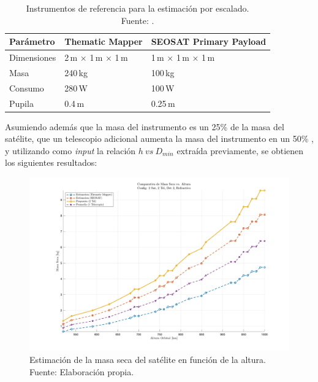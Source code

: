 \begin{table}[H]
    \centering
    \caption{Instrumentos de referencia para la estimación por escalado. \\ Fuente: \cite{zorita_dimensiones_2023}.}
    \begin{tabular}{@{}lll@{}}
        \toprule
        Parámetro     & Thematic Mapper       & SEOSAT Primary Payload \\
        \midrule
        Dimensiones   & 2\,m × 1\,m × 1\,m     & 1\,m × 1\,m × 1\,m      \\
        Masa          & 240\,kg                & 100\,kg                \\
        Consumo       & 280\,W                 & 100\,W                 \\
        Pupila        & 0.4\,m                 & 0.25\,m                \\
        \bottomrule
    \end{tabular}
    
\end{table}

Asumiendo además que la masa del instrumento es un 25\% de la masa del satélite, que un telescopio adicional aumenta la masa del instrumento en un 50\% \cite{zorita_dimensiones_2023}, y utilizando como \textit{input} la relación $h\ vs\ D_{min}$ extraída previamente, se obtienen los siguientes resultados:

\begin{figure}[H]
    \centering
    \includegraphics[width=1\linewidth]{5.Mission/MasaSeca_Comparativa_2sat_2tel_Det2_Refractivo.jpg}
    \caption{Estimación de la masa seca del satélite en función de la altura. \\Fuente: Elaboración propia.}
    \label{masaseca}
\end{figure}

